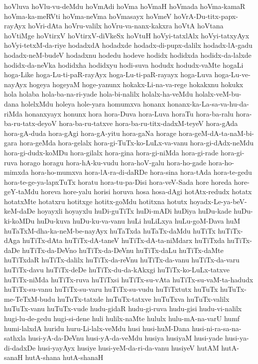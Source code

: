 {hoVluva
hoVlu-vu-deMdu
hoVmAdi
hoVma
hoVmaH
hoVmada
hoVma-kamaR
hoVma-ka-meRVti
hoVma-neVma
hoVmasayx
hoVmeV
hoVrA-Du-titx-papx-rayAyx
hoVri-dAta
hoVru-valilx
hoVru-va-nanx-kakxra
hoVtA
hoVtana
hoVtiMge
hoVtirxV
hoVtirxV-diVkeSx
hoVtuH
hoVyi-tatxlAlx
hoVyi-tatxyAyx
hoVyi-tetxM-da-riye
hodadxdA
hodadxde
hodadx-di-pupx-dalilx
hodadx-lA-gadu
hodadx-neM-budeV
hodadxnu
hodedu
hodeve
hodidx
hodidxda
hodidx-da-lalxde
hodidx-da-neVka
hodidxha
hodidxyu
hodi-suva
hodudx
hodudx-vaMte
hogaLi
hoga-Like
hoga-Lu-ti-paR-rayAyx
hoga-Lu-ti-paR-rayayx
hoga-Luva
hoga-Lu-ve-nayAyx
hogeya
hogeyaM
hoge-yanunx
hokakx-Li-na-va-rege
hokakxnu
hokukx
hola
holaba
hola-ba-na-ri-yade
hola-bi-nalilx
holalx-ha-veMdu
holalx-veM-bu-dana
holelxMdu
holeya
hole-yara
homumxva
honanx
honanx-ka-La-sa-va-hu-da-riMda
honanxyayx
honunx
hora
hora-Duva
hora-Luva
horaTu
hora-ba-ralu
hora-ba-ru-tatx-deyoV
hora-ba-ru-tatxve
hora-ba-ru-titx-dadxM-teyeV
hora-gAda
hora-gA-duda
hora-gAgi
hora-gA-yitu
hora-gaNa
horage
hora-geM-dA-ta-naM-bi-gara
hora-geMda
hora-gelalx
hora-gi-TuTx-ko-LuLx-va-vanu
hora-gi-dAdx-neMdu
hora-gi-dudx-koMDu
hora-gilalx
hora-gina
hora-gi-niMda
hora-gi-rade
hora-gi-ruva
horago
horagu
hora-hA-ku-vudu
hora-hoV-galu
hora-ho-gade
hora-ho-mimxda
hora-ho-mumxva
hora-lA-ra-di-daRDe
hora-sina
hora-tAda
hora-te-gedu
hora-te-ge-ya-lapxTuTx
horatu
hora-tu-pa-Disi
hora-veV-Sada
hore
horeda
hore-geY-taMdu
horeva
hore-yalu
horisi
horuva
hosa
hosa-dAgi
hotAtx-redudx
hotatx
hotatxMte
hotatxru
hotitxge
hotitx-goMdu
hotitxna
hotutx
hoyadx-Le-ya-beV-keM-daDe
hoyayxli
hoyayxlu
huDi-guTiTx
huDi-mADi
huDiya
huDu-kade
huDu-ki-koMDu
huDu-kuva
huDu-ku-va-vanu
huLi
huLiLxya
huLu-goM-Dava
huM
huTaTxM-dha-ka-neM-be-nayAyx
huTaTxda
huTaTx-daMdu
huTiTx
huTiTx-dAga
huTiTx-dAta
huTiTx-dA-taneV
huTiTx-dA-ta-niMdarx
huTiTxda
huTiTx-daDe
huTiTx-da-DeVno
huTiTx-da-DeVnu
huTiTx-daLu
huTiTx-daMte
huTiTxdaR
huTiTx-dalilx
huTiTx-da-reVnu
huTiTx-da-vanu
huTiTx-da-varu
huTiTx-davu
huTiTx-deDe
huTiTx-du-da-kAkxgi
huTiTx-ko-LuLx-tatxve
huTiTx-niMda
huTiTx-ruva
huTiTxsi
huTiTx-su-vAta
huTiTx-su-vaM-ta-hadudx
huTiTx-su-vanu
huTiTx-su-varu
huTiTx-su-vudu
huTiTxtutx
huTuTx
huTuTx-me-TeTxM-budu
huTuTx-tatxde
huTuTx-tatxve
huTuTxva
huTuTx-valilx
huTuTx-vanu
huTuTx-vude
hudu-gidaR
hudu-gi-ruva
hudu-gisi
hudu-vi-nalilx
hugi-lu-de-gedu
hugi-si-dene
huli
hulilx-naMte
hululx
hulu-mA-na-varU
humf
humi-lalxdA
huridu
huru-Li-lalx-veMdu
husi
husi-huM-Dana
husi-ni-ra-sa-na-sathxla
husi-yA-da-DeVnu
husi-yA-da-veMdu
husiya
husiyaM
husi-yade
husi-ya-di-dadxDe
husi-yayAyx
husiye
husi-yeM-da-ri-da-vanu
husiyeV
hutAM
hutA-sanaH
hutA-shana
hutA-shanaH
}
